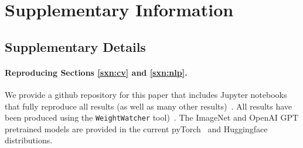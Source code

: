 \section{Supplementary Information}
\label{sxn:appendix}


\subsection{Supplementary Details} 

\paragraph{Reproducing Sections \ref{sxn:cv} and \ref{sxn:nlp}. }   

We provide a github repository for this paper that includes Jupyter notebooks that fully reproduce all results (as well as many other results)~\cite{kdd20_sub_repo}.
All results have been produced using the \texttt{WeightWatcher} tool)~\cite{weightwatcher_package}.
The ImageNet and OpenAI GPT pretrained models are provided in the current 
pyTorch~\cite{pytorch} and Huggingface~\cite{huggingface} distributions.

